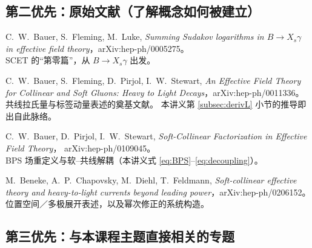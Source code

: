 \documentclass[UTF8,a4paper,11pt]{ctexart}
\theoremstyle{definition}
\theoremstyle{remark}
\theoremstyle{plain}
\begin{document}
\subsection{第二优先：原始文献（了解概念如何被建立）}

\begin{enumerate}[label=\textbf{[\arabic*]}, leftmargin=1.3cm, start=5]
\item C.~W.~Bauer, S.~Fleming, M.~Luke,
      \emph{Summing Sudakov logarithms in $B\to X_s\gamma$ in
      effective field theory}，arXiv:hep-ph/0005275。\\
      SCET 的“第零篇”，从 $B\to X_s\gamma$ 出发。
\item C.~W.~Bauer, S.~Fleming, D.~Pirjol, I.~W.~Stewart,
      \emph{An Effective Field Theory for Collinear and Soft Gluons:
      Heavy to Light Decays}，arXiv:hep-ph/0011336。\\
      共线拉氏量与标签动量表述的奠基文献。
      本讲义第 \ref{subsec:derivL} 小节的推导即出自此脉络。
\item C.~W.~Bauer, D.~Pirjol, I.~W.~Stewart,
      \emph{Soft-Collinear Factorization in Effective Field Theory}，
      arXiv:hep-ph/0109045。\\
      BPS 场重定义与软--共线解耦（本讲义式 \eqref{eq:BPS}--\eqref{eq:decoupling}）。
\item M.~Beneke, A.~P.~Chapovsky, M.~Diehl, T.~Feldmann,
      \emph{Soft-collinear effective theory and heavy-to-light currents
      beyond leading power}，arXiv:hep-ph/0206152。\\
      位置空间／多极展开表述，以及幂次修正的系统构造。
\end{enumerate}

\subsection{第三优先：与本课程主题直接相关的专题}
\end{document}
